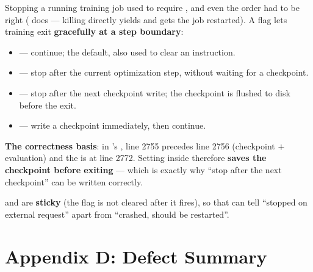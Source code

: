 Stopping a running training job used to require , and even the order had to be
right ( does
 --- killing 
directly yields  and gets the job restarted). A flag lets training exit
\textbf{gracefully at a step boundary}:

\begin{itemize}
\item {} --- continue; the default, also used to clear an instruction.
\item {} --- stop after the current optimization step, without waiting for a
      checkpoint.
\item {} --- stop after the next checkpoint write; the checkpoint is
      flushed to disk before the exit.
\item {} --- write a checkpoint immediately, then continue.
\end{itemize}

\textbf{The correctness basis}: in 's
, line 2755  precedes line 2756
 (checkpoint $+$ evaluation) and the  is at
line 2772. Setting  inside  therefore
\textbf{saves the checkpoint before exiting} --- which is exactly why ``stop after the next
checkpoint'' can be written correctly.

 and  are \textbf{sticky} (the flag is not cleared after it
fires), so that  can tell ``stopped on external request'' apart from
``crashed, should be restarted''.

\section{Appendix D: Defect Summary}
\label{sec:en-appD}

